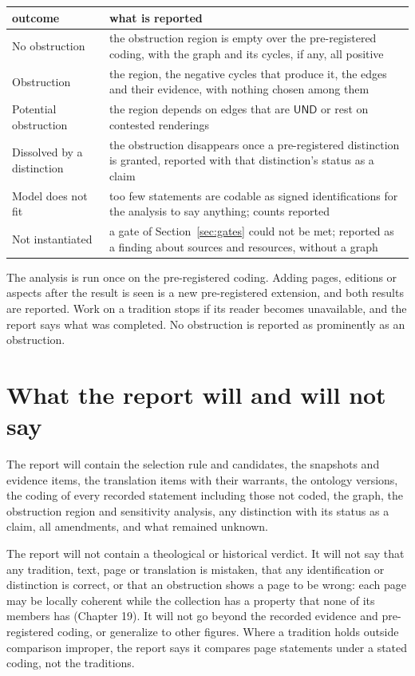 \documentclass[11pt]{article}
\newcommand{\UND}{\textsf{UND}}
\begin{document}
\begin{center}
\small
\begin{tabularx}{\textwidth}{@{}l X@{}}
\toprule
outcome & what is reported\\
\midrule
No obstruction & the obstruction region is empty over the pre-registered coding, with the graph and its cycles, if any, all positive\\
Obstruction & the region, the negative cycles that produce it, the edges and their evidence, with nothing chosen among them\\
Potential obstruction & the region depends on edges that are $\UND$ or rest on contested renderings\\
Dissolved by a distinction & the obstruction disappears once a pre-registered distinction is granted, reported with that distinction's status as a claim\\
Model does not fit & too few statements are codable as signed identifications for the analysis to say anything; counts reported\\
Not instantiated & a gate of Section~\ref{sec:gates} could not be met; reported as a finding about sources and resources, without a graph\\
\bottomrule
\end{tabularx}
\end{center}

The analysis is run once on the pre-registered coding. Adding pages, editions or aspects after the result is seen is a new pre-registered extension, and both results are reported. Work on a tradition stops if its reader becomes unavailable, and the report says what was completed. No obstruction is reported as prominently as an obstruction.

\section{What the report will and will not say}\label{sec:report}

The report will contain the selection rule and candidates, the snapshots and evidence items, the translation items with their warrants, the ontology versions, the coding of every recorded statement including those not coded, the graph, the obstruction region and sensitivity analysis, any distinction with its status as a claim, all amendments, and what remained unknown.

The report will not contain a theological or historical verdict. It will not say that any tradition, text, page or translation is mistaken, that any identification or distinction is correct, or that an obstruction shows a page to be wrong: each page may be locally coherent while the collection has a property that none of its members has (Chapter 19). It will not go beyond the recorded evidence and pre-registered coding, or generalize to other figures. Where a tradition holds outside comparison improper, the report says it compares page statements under a stated coding, not the traditions.
\end{document}
